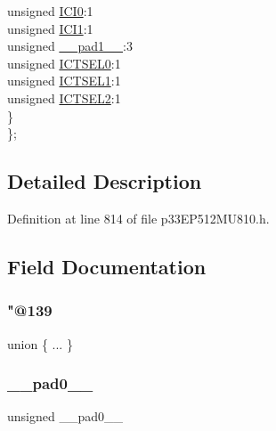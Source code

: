 \begin{DoxyCompactItemize}
\begin{tabbing}
\>\>unsigned \hyperlink{structtag_i_c6_c_o_n1_b_i_t_s_a6f1b5da2706b7c15fc8c9a01a30deaff}{ICI0}:1\\
\>\>unsigned \hyperlink{structtag_i_c6_c_o_n1_b_i_t_s_a7d5c777f0bc43f66f40462f79ed2179c}{ICI1}:1\\
\>\>unsigned \hyperlink{structtag_i_c6_c_o_n1_b_i_t_s_acaf2d0924a107ec6e8d2e31febaf66f9}{\_\_pad1\_\_}:3\\
\>\>unsigned \hyperlink{structtag_i_c6_c_o_n1_b_i_t_s_af6dd4d0e816b18462680d4b22fa926d3}{ICTSEL0}:1\\
\>\>unsigned \hyperlink{structtag_i_c6_c_o_n1_b_i_t_s_aa29140e739d886362537f87d199c4134}{ICTSEL1}:1\\
\>\>unsigned \hyperlink{structtag_i_c6_c_o_n1_b_i_t_s_a47d80892d449e6edbd5ba2ba9ff06deb}{ICTSEL2}:1\\
\>\} \\
\}; \\

\end{tabbing}\end{DoxyCompactItemize}


\subsection{Detailed Description}


Definition at line 814 of file p33\+E\+P512\+M\+U810.\+h.



\subsection{Field Documentation}
\mbox{\label{structtag_i_c6_c_o_n1_b_i_t_s_a2be52b228fcbc34fb45e7673c0e34c99}} 
\subsubsection{\texorpdfstring{"@139}{@139}}
{\footnotesize\ttfamily union \{ ... \} }

\mbox{\label{structtag_i_c6_c_o_n1_b_i_t_s_adf71f3d8410c1f1dbbc96680a92c49af}} 
\subsubsection{\texorpdfstring{\+\_\+\+\_\+pad0\+\_\+\+\_\+}{\_\_pad0\_\_}}
{\footnotesize\ttfamily unsigned \+\_\+\+\_\+pad0\+\_\+\+\_\+}



